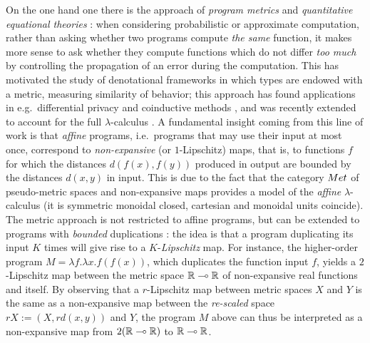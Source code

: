 On the one hand one there is the approach of \emph{program metrics} \cite{Reed2010, Gaboardi2017, Gabo2019} and \emph{quantitative equational theories} \cite{Plotk}: when considering probabilistic or approximate computation, rather than asking whether two programs compute \emph{the same} function, it makes more sense to ask whether they compute functions which do not differ \emph{too much} by controlling the propagation of an error during the computation.
This has motivated the study of denotational frameworks in which types are endowed with a metric, measuring similarity of behavior; this approach has found  applications in e.g.~differential privacy \cite{Reed2010} and coinductive methods \cite{Bonchi2018}, and was recently extended to account for the full $\lambda$-calculus \cite{Geoffroy2020, PistoneLICS, PistoneFSCD2022}.
A fundamental insight coming from this line of work is that \emph{affine} programs, i.e.~programs that may use their input at most once, correspond to \emph{non-expansive} (or $1$-Lipschitz) maps, that is, to functions $f$ for which the distances
$d(f(x),f(y))$ produced in output are bounded by the distances $d(x,y)$ in input. 
This is due to the fact that the category $\Met$ of pseudo-metric spaces and non-expansive maps provides a model of the %
\emph{affine} $\lambda$-calculus (it is symmetric monoidal closed, cartesian and monoidal units coincide). 
The metric approach is not restricted to affine programs, but can be extended to programs with \emph{bounded} duplications \cite{Reed2010, Gaboardi2017}: the idea is that a program duplicating its input $K$ times will give rise to a $K$-\emph{Lipschitz} map.
For instance, the higher-order program $M=\lambda f.\lambda x.f(f(x))$, which duplicates the function input $f$, yields a $2$-Lipschitz map between the metric space $\mathbb{R}\multimap \mathbb{R}$ of non-expansive real functions and itself. %
By observing that a $r$-Lipschitz map between metric spaces $X$ and $Y$ is the same as a non-expansive map between the \emph{re-scaled} space $rX:=(X,%
rd(x,y))$ and $Y$, the program $M$ above 
can thus be interpreted as a non-expansive map from $2(\mathbb{R}\multimap \mathbb{R})$ to $\mathbb{R}\multimap \mathbb{R}$.

